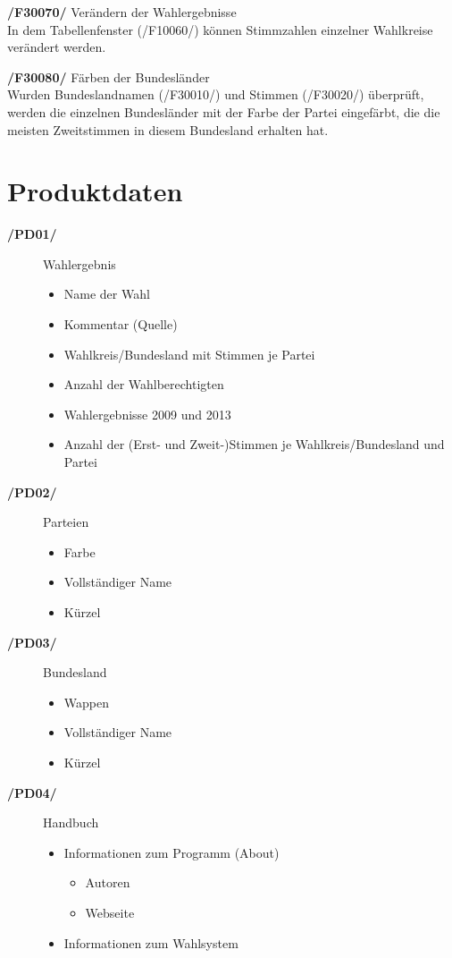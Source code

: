 \documentclass[10pt,a4paper]{article}
\begin{document}
\begin{description}
	\item \textbf{/F30070/} Verändern der Wahlergebnisse \hfill \\
	In dem Tabellenfenster (/F10060/) können Stimmzahlen einzelner Wahlkreise verändert werden.
	\item \textbf{/F30080/} Färben der Bundesländer \hfill \\
	Wurden Bundeslandnamen (/F30010/) und Stimmen (/F30020/) überprüft, werden die einzelnen Bundesländer mit der Farbe der Partei eingefärbt, die die meisten Zweitstimmen in diesem Bundesland erhalten hat.
	
\end{description}

\section{Produktdaten}
\begin{description}
	\item[\textbf{/PD01/}] Wahlergebnis
	\begin{itemize}
		\item Name der Wahl
		\item Kommentar (Quelle)
		\item Wahlkreis/Bundesland mit Stimmen je Partei
		\item Anzahl der Wahlberechtigten
		\item Wahlergebnisse 2009 und 2013
		\item Anzahl der (Erst- und Zweit-)Stimmen je Wahlkreis/Bundesland und Partei
	\end{itemize}
	
	\item[\textbf{/PD02/}] Parteien
	\begin{itemize}
		\item Farbe
		\item Vollständiger Name
		\item Kürzel
	\end{itemize}
	
	\item[\textbf{/PD03/}] Bundesland
	\begin{itemize}
		\item Wappen		
		\item Vollständiger Name
		\item Kürzel
	\end{itemize}
	
	\item[\textbf{/PD04/}] Handbuch
	\begin{itemize}
		\item Informationen zum Programm (About)
		\begin{itemize}
			\item Autoren
			\item Webseite
		\end{itemize}
		\item Informationen zum Wahlsystem
	\end{itemize}
\end{description}
\end{document}
